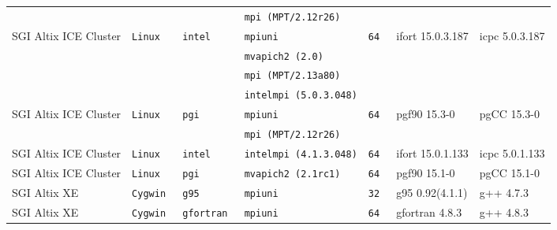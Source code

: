 \begin{longtable}{lllllll}
                      &           &                 &\tt mpi (MPT/2.12r26)&                 &                                     &                                 \\
SGI Altix ICE Cluster &\tt Linux  &\tt intel        &\tt mpiuni           &\tt 64           & ifort \footnotesize 15.0.3.187      & icpc \footnotesize 5.0.3.187    \\ %
                      &           &                 &\tt mvapich2 (2.0)   &                 &                                     &                                 \\
                      &           &                 &\tt mpi (MPT/2.13a80)&                 &                                     &                                 \\
                      &           &                 &\tt intelmpi (5.0.3.048)&              &                                     &                                 \\
SGI Altix ICE Cluster &\tt Linux  &\tt pgi          &\tt mpiuni           &\tt 64           & pgf90 \footnotesize 15.3-0          & pgCC \footnotesize 15.3-0       \\ %
                      &           &                 &\tt mpi (MPT/2.12r26)&                 &                                     &                                 \\
SGI Altix ICE Cluster &\tt Linux  &\tt intel        &\tt intelmpi (4.1.3.048)&\tt 64        & ifort \footnotesize 15.0.1.133      & icpc \footnotesize 5.0.1.133    \\ %
SGI Altix ICE Cluster &\tt Linux  &\tt pgi          &\tt mvapich2 (2.1rc1)&\tt 64           & pgf90 \footnotesize 15.1-0          & pgCC \footnotesize 15.1-0       \\ %
SGI Altix XE          &\tt Cygwin &\tt g95          &\tt mpiuni           &\tt 32           & g95 \footnotesize 0.92(4.1.1)       & g++  \footnotesize 4.7.3        \\ %
SGI Altix XE          &\tt Cygwin &\tt gfortran     &\tt mpiuni           &\tt 64           & gfortran \footnotesize 4.8.3        & g++  \footnotesize 4.8.3        \\ %

\end{longtable}
